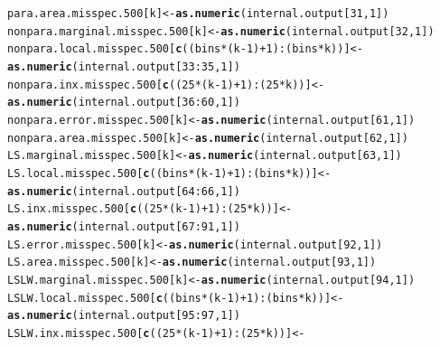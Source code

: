 \documentclass[11pt]{article}\usepackage[]{graphicx}\usepackage[]{color}
\makeatletter
\newcommand{\hlnum}[1]{\textcolor[rgb]{0.686,0.059,0.569}{#1}}%
\newcommand{\hlopt}[1]{\textcolor[rgb]{0,0,0}{#1}}%
\newcommand{\hlstd}[1]{\textcolor[rgb]{0.345,0.345,0.345}{#1}}%
\newcommand{\hlkwb}[1]{\textcolor[rgb]{0.69,0.353,0.396}{#1}}%
\newcommand{\hlkwd}[1]{\textcolor[rgb]{0.737,0.353,0.396}{\textbf{#1}}}%
\newenvironment{kframe}{%
 \def\at@end@of@kframe{}%
 \ifinner\ifhmode%
  \def\at@end@of@kframe{\end{minipage}}%
  \begin{minipage}{\columnwidth}%
 \fi\fi%
 \def\FrameCommand##1{\hskip\@totalleftmargin \hskip-\fboxsep
 \colorbox{shadecolor}{##1}\hskip-\fboxsep
     \hskip-\linewidth \hskip-\@totalleftmargin \hskip\columnwidth}%
 \MakeFramed {\advance\hsize-\width
   \@totalleftmargin\z@ \linewidth\hsize
   \@setminipage}}%
 {\par\unskip\endMakeFramed%
 \at@end@of@kframe}
\newenvironment{knitrout}{}{} %
\makeatother
\begin{document}
\begin{knitrout}
\begin{kframe}
\begin{alltt}
  \hlstd{para.area.misspec.500[k]} \hlkwb{<-} \hlkwd{as.numeric}\hlstd{(internal.output[}\hlnum{31}\hlstd{,} \hlnum{1}\hlstd{])}
  \hlstd{nonpara.marginal.misspec.500[k]} \hlkwb{<-} \hlkwd{as.numeric}\hlstd{(internal.output[}\hlnum{32}\hlstd{,} \hlnum{1}\hlstd{])}
  \hlstd{nonpara.local.misspec.500[}\hlkwd{c}\hlstd{((bins}\hlopt{*}\hlstd{(k}\hlopt{-}\hlnum{1}\hlstd{)}\hlopt{+}\hlnum{1}\hlstd{)}\hlopt{:}\hlstd{(bins}\hlopt{*}\hlstd{k))]} \hlkwb{<-}
    \hlkwd{as.numeric}\hlstd{(internal.output[}\hlnum{33}\hlopt{:}\hlnum{35}\hlstd{,} \hlnum{1}\hlstd{])}
  \hlstd{nonpara.inx.misspec.500[}\hlkwd{c}\hlstd{((}\hlnum{25}\hlopt{*}\hlstd{(k}\hlopt{-}\hlnum{1}\hlstd{)}\hlopt{+}\hlnum{1}\hlstd{)}\hlopt{:}\hlstd{(}\hlnum{25}\hlopt{*}\hlstd{k))]} \hlkwb{<-}
    \hlkwd{as.numeric}\hlstd{(internal.output[}\hlnum{36}\hlopt{:}\hlnum{60}\hlstd{,} \hlnum{1}\hlstd{])}
  \hlstd{nonpara.error.misspec.500[k]} \hlkwb{<-} \hlkwd{as.numeric}\hlstd{(internal.output[}\hlnum{61}\hlstd{,} \hlnum{1}\hlstd{])}
  \hlstd{nonpara.area.misspec.500[k]} \hlkwb{<-} \hlkwd{as.numeric}\hlstd{(internal.output[}\hlnum{62}\hlstd{,} \hlnum{1}\hlstd{])}
  \hlstd{LS.marginal.misspec.500[k]} \hlkwb{<-} \hlkwd{as.numeric}\hlstd{(internal.output[}\hlnum{63}\hlstd{,} \hlnum{1}\hlstd{])}
  \hlstd{LS.local.misspec.500[}\hlkwd{c}\hlstd{((bins}\hlopt{*}\hlstd{(k}\hlopt{-}\hlnum{1}\hlstd{)}\hlopt{+}\hlnum{1}\hlstd{)}\hlopt{:}\hlstd{(bins}\hlopt{*}\hlstd{k))]} \hlkwb{<-}
    \hlkwd{as.numeric}\hlstd{(internal.output[}\hlnum{64}\hlopt{:}\hlnum{66}\hlstd{,} \hlnum{1}\hlstd{])}
  \hlstd{LS.inx.misspec.500[}\hlkwd{c}\hlstd{((}\hlnum{25}\hlopt{*}\hlstd{(k}\hlopt{-}\hlnum{1}\hlstd{)}\hlopt{+}\hlnum{1}\hlstd{)}\hlopt{:}\hlstd{(}\hlnum{25}\hlopt{*}\hlstd{k))]} \hlkwb{<-}
    \hlkwd{as.numeric}\hlstd{(internal.output[}\hlnum{67}\hlopt{:}\hlnum{91}\hlstd{,} \hlnum{1}\hlstd{])}
  \hlstd{LS.error.misspec.500[k]} \hlkwb{<-} \hlkwd{as.numeric}\hlstd{(internal.output[}\hlnum{92}\hlstd{,} \hlnum{1}\hlstd{])}
  \hlstd{LS.area.misspec.500[k]} \hlkwb{<-} \hlkwd{as.numeric}\hlstd{(internal.output[}\hlnum{93}\hlstd{,} \hlnum{1}\hlstd{])}
  \hlstd{LSLW.marginal.misspec.500[k]} \hlkwb{<-} \hlkwd{as.numeric}\hlstd{(internal.output[}\hlnum{94}\hlstd{,} \hlnum{1}\hlstd{])}
  \hlstd{LSLW.local.misspec.500[}\hlkwd{c}\hlstd{((bins}\hlopt{*}\hlstd{(k}\hlopt{-}\hlnum{1}\hlstd{)}\hlopt{+}\hlnum{1}\hlstd{)}\hlopt{:}\hlstd{(bins}\hlopt{*}\hlstd{k))]} \hlkwb{<-}
    \hlkwd{as.numeric}\hlstd{(internal.output[}\hlnum{95}\hlopt{:}\hlnum{97}\hlstd{,} \hlnum{1}\hlstd{])}
  \hlstd{LSLW.inx.misspec.500[}\hlkwd{c}\hlstd{((}\hlnum{25}\hlopt{*}\hlstd{(k}\hlopt{-}\hlnum{1}\hlstd{)}\hlopt{+}\hlnum{1}\hlstd{)}\hlopt{:}\hlstd{(}\hlnum{25}\hlopt{*}\hlstd{k))]} \hlkwb{<-}

\end{alltt}
\end{kframe}
\end{knitrout}
\end{document}
